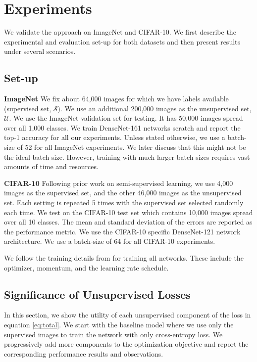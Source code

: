 \section{Experiments}
\label{sec:experiments}

We validate the approach on ImageNet and CIFAR-10. We first describe the experimental and evaluation
set-up for both datasets and then present results under several scenarios.

\subsection{Set-up}
\textbf{ImageNet} We fix about 64,000 images for which
we have labels available (supervised set, $\mathcal{S}$). We use an additional 200,000 images as the
unsupervised set, $\mathcal{U}$. We use the ImageNet validation set for testing. It has 50,000
images spread over all 1,000 classes. We train DenseNet-161 networks scratch and report the
top-1 accuracy for all our experiments. Unless stated otherwise, we use a batch-size of 52 for all
ImageNet experiments. We later discuss that this might not be the ideal batch-size. However,
training with much larger batch-sizes requires vast amounts of time and resources.


\textbf{CIFAR-10} Following prior work on semi-supervised learning, we use 4,000
images as the supervised set, and the other 46,000 images as the unsupervised set. Each setting
is repeated 5 times with the supervised set selected randomly each time. We test on the CIFAR-10
test set which contains 10,000 images spread over all 10 classes. The mean and standard
deviation of the errors are reported as the performance metric. We use the CIFAR-10 specific
DenseNet-121 network architecture. We use a batch-size of 64 for all CIFAR-10 experiments. 

We follow the training details from \cite{densenet} for training all networks. These include
the optimizer, momentum, and the learning rate schedule.

\subsection{Significance of Unsupervised Losses}
In this section, we show the utility of each unsupervised component of the loss in equation \ref{eq:total}. We
start with the baseline model where we use only the supervised images to train the network with only cross-entropy
loss. We progressively add more components to the optimization objective and report the
corresponding performance results and observations.

